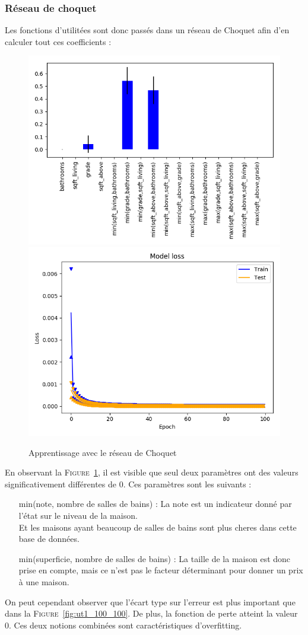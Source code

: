 \subsubsection{Réseau de choquet}\label{subsubsec:real-ch}
Les fonctions d'utilitées sont donc passés dans un réseau de Choquet afin d'en calculer tout ces coefficients :
\begin{figure}[H]
    \center
    \includegraphics[width=0.49\columnwidth]{pict/real/ch/net.png}
    \includegraphics[width=0.49\columnwidth]{pict/real/ch/learn.png}
	\caption{Apprentissage avec le réseau de Choquet}
	\label{fig:real-Choquet}
\end{figure}


En observant la \textsc{Figure}\ \ref{fig:real-Choquet}, il est visible que seul deux paramètres
ont des valeurs significativement différentes de $0$.
Ces paramètres sont les suivants :
\begin{itemize}
    \item[min(note, nombre de salles de bains) :] La note est un indicateur donné par l'état sur le niveau de la maison.\\
        Et les maisons ayant beaucoup de salles de bains sont plus cheres dans cette base de données.
    \item[min(superficie, nombre de salles de bains) :] La taille de la maison est donc prise en compte,
        mais ce n'est pas le facteur déterminant pour donner un prix à une maison.
\end{itemize}


On peut cependant observer que l'écart type sur l'erreur est plus important
que dans la \textsc{Figure}\ \ref{fig:ut1_100_100}.
De plus, la fonction de perte atteint la valeur $0$.
Ces deux notions combinées sont caractéristiques d'overfitting.
